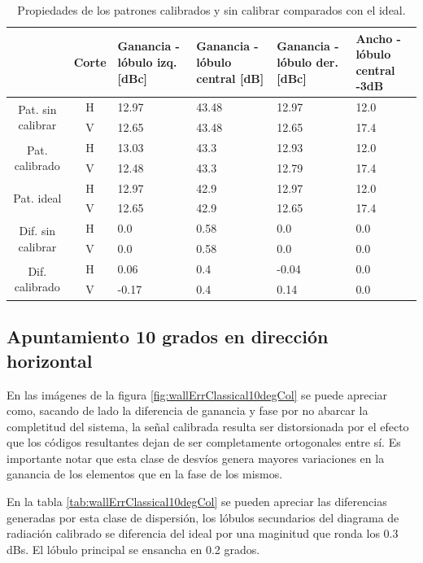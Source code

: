 \begin{table}[H]
  \footnotesize
  \centering
  \begin{tabular}{|c|c|p{2cm}|p{2.5cm}|p{2.5cm}|p{2.5cm}|}
    \cline{2-6}
    \multicolumn{1}{c|}{} & Corte & Ganancia - lóbulo izq. [dBc] & Ganancia - lóbulo central [dB] &
    Ganancia - lóbulo der. [dBc] & Ancho - lóbulo central -3dB \tabularnewline\hline
    \multirow{2}{2cm}{Pat. sin calibrar} & H & 12.97 & 43.48 & 12.97 & 12.0 \tabularnewline\cline{2-6}
     & V & 12.65 & 43.48 & 12.65 & 17.4 \tabularnewline\hline
    \multirow{2}{2cm}{Pat. calibrado} & H & 13.03 & 43.3 & 12.93 & 12.0 \tabularnewline\cline{2-6}
     & V & 12.48 & 43.3 & 12.79 & 17.4 \tabularnewline\hline
    \multirow{2}{2cm}{Pat. ideal} & H & 12.97 & 42.9 & 12.97 & 12.0 \tabularnewline\cline{2-6}
     & V & 12.65 & 42.9 & 12.65 & 17.4 \tabularnewline\hline
    \multirow{2}{2cm}{Dif. sin calibrar} & H & 0.0 & 0.58 & 0.0 & 0.0\tabularnewline\cline{2-6}
     & V & 0.0 & 0.58 & 0.0 & 0.0 \tabularnewline\hline
    \multirow{2}{2cm}{Dif. calibrado} & H & 0.06 & 0.4 & -0.04 & 0.0 \tabularnewline\cline{2-6}
     & V & -0.17 & 0.4 & 0.14 & 0.0 \tabularnewline\hline
  \end{tabular}
  \caption{Propiedades de los patrones calibrados y sin calibrar comparados con el ideal.}
  \label{tab:wallErrClassical0deg}
\end{table}


\subsection{Apuntamiento 10 grados en dirección horizontal}

En las imágenes de la figura \ref{fig:wallErrClassical10degCol} se puede apreciar como, sacando de lado la diferencia de ganancia 
y fase por no abarcar la completitud del sistema, la señal calibrada resulta ser distorsionada por el efecto que los códigos 
resultantes dejan de ser completamente ortogonales entre sí. Es importante notar que esta clase de desvíos genera mayores 
variaciones en la ganancia de los elementos que en la fase de los mismos.
 
En la tabla \ref{tab:wallErrClassical10degCol} se pueden apreciar las diferencias generadas por esta clase de dispersión, los 
lóbulos secundarios del diagrama de radiación calibrado se diferencia del ideal por una maginitud que ronda los 0.3 dBs. El 
lóbulo principal se ensancha en 0.2 grados.


